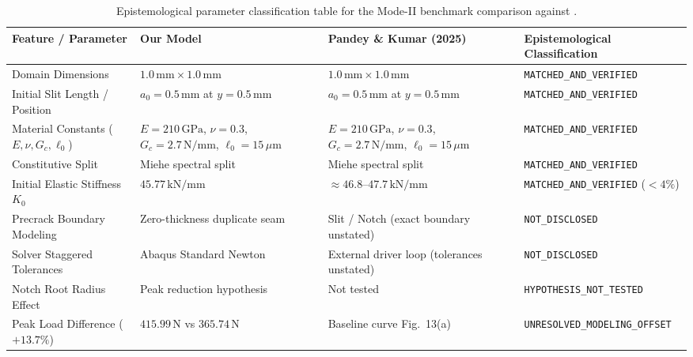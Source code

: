 \begin{table}[htbp]
\centering
\footnotesize
\caption{Epistemological parameter classification table for the Mode-II benchmark comparison against \citet{pandey2025}.}
\label{tab:mode2_epistemological_audit}
\begin{tabularx}{\textwidth}{>{\raggedright\arraybackslash}p{} >{\raggedright\arraybackslash}p{} >{\raggedright\arraybackslash}p{} >{\raggedright\arraybackslash}X}
\toprule
\textbf{Feature / Parameter} & \textbf{Our Model} & \textbf{Pandey \& Kumar (2025)} & \textbf{Epistemological Classification} \\
\midrule
Domain Dimensions & $1.0\,\mathrm{mm} \times 1.0\,\mathrm{mm}$ & $1.0\,\mathrm{mm} \times 1.0\,\mathrm{mm}$ & \texttt{MATCHED\_}\allowbreak\texttt{AND\_}\allowbreak\texttt{VERIFIED} \\
Initial Slit Length / Position & $a_0 = 0.5\,\mathrm{mm}$ at $y = 0.5\,\mathrm{mm}$ & $a_0 = 0.5\,\mathrm{mm}$ at $y = 0.5\,\mathrm{mm}$ & \texttt{MATCHED\_}\allowbreak\texttt{AND\_}\allowbreak\texttt{VERIFIED} \\
Material Constants ($E, \nu, G_c, \ell_0$) & $E=210\,\mathrm{GPa}$, $\nu=0.3$, $G_c=2.7\,\mathrm{N/mm}$, $\ell_0=15\,\mu\mathrm{m}$ & $E=210\,\mathrm{GPa}$, $\nu=0.3$, $G_c=2.7\,\mathrm{N/mm}$, $\ell_0=15\,\mu\mathrm{m}$ & \texttt{MATCHED\_}\allowbreak\texttt{AND\_}\allowbreak\texttt{VERIFIED} \\
Constitutive Split & Miehe spectral split & Miehe spectral split & \texttt{MATCHED\_}\allowbreak\texttt{AND\_}\allowbreak\texttt{VERIFIED} \\
Initial Elastic Stiffness $K_0$ & $45.77\,\mathrm{kN/mm}$ & $\approx 46.8\text{--}47.7\,\mathrm{kN/mm}$ & \texttt{MATCHED\_}\allowbreak\texttt{AND\_}\allowbreak\texttt{VERIFIED} ($<4\%$) \\
Precrack Boundary Modeling & Zero-thickness duplicate seam & Slit / Notch (exact boundary unstated) & \texttt{NOT\_}\allowbreak\texttt{DISCLOSED} \\
Solver Staggered Tolerances & Abaqus Standard Newton & External driver loop (tolerances unstated) & \texttt{NOT\_}\allowbreak\texttt{DISCLOSED} \\
Notch Root Radius Effect & Peak reduction hypothesis & Not tested & \texttt{HYPOTHESIS\_}\allowbreak\texttt{NOT\_}\allowbreak\texttt{TESTED} \\
Peak Load Difference ($+13.7\%$) & $415.99\,\mathrm{N}$ vs $365.74\,\mathrm{N}$ & Baseline curve Fig.~13(a) & \texttt{UNRESOLVED\_}\allowbreak\texttt{MODELING\_}\allowbreak\texttt{OFFSET} \\
\bottomrule
\end{tabularx}
\end{table}


